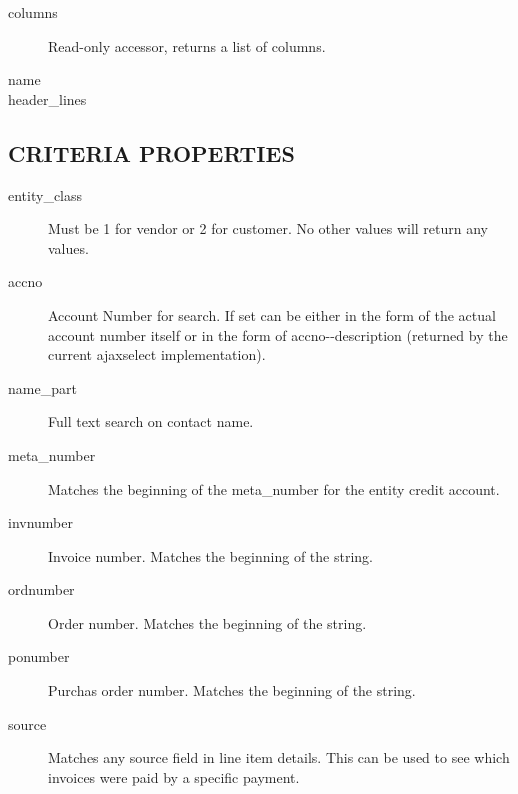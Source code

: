 \begin{description}
\begin{description}
\begin{description}
\begin{description}
\begin{description}
\begin{description}
\begin{description}
\begin{description}
\begin{description}
\begin{description}
\begin{description}
\item[{columns}] \mbox{}

Read-only accessor, returns a list of columns.


\item[{name}] \mbox{}
\item[{header\_lines}] \mbox{}\end{description}
\subsection*{CRITERIA PROPERTIES\label{LedgerSMB::DBObject::Report::Contact::Purchase_CRITERIA_PROPERTIES}}
\begin{description}

\item[{entity\_class}] \mbox{}

Must be 1 for vendor or 2 for customer.  No other values will return any values.


\item[{accno}] \mbox{}

Account Number for search.  If set can be either in the form of the actual 
account number itself or in the form of accno-{}-description (returned by the
current ajaxselect implementation).


\item[{name\_part}] \mbox{}

Full text search on contact name.


\item[{meta\_number}] \mbox{}

Matches the beginning of the meta\_number for the entity credit account.


\item[{invnumber}] \mbox{}

Invoice number.  Matches the beginning of the string.


\item[{ordnumber}] \mbox{}

Order number.  Matches the beginning of the string.


\item[{ponumber}] \mbox{}

Purchas order number.  Matches the beginning of the string.


\item[{source}] \mbox{}

Matches any source field in line item details.  This can be used to see which
invoices were paid by a specific payment.



\end{description}
\end{description}
\end{description}
\end{description}
\end{description}
\end{description}
\end{description}
\end{description}
\end{description}
\end{description}
\end{description}
